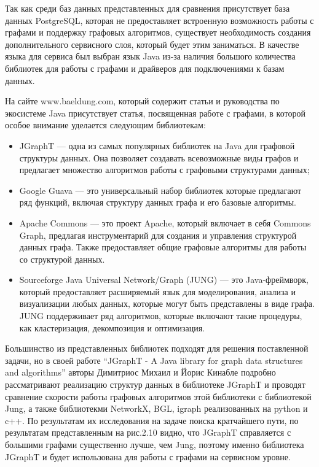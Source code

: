 Так как среди баз данных представленных для сравнения присутствует база данных PostgreSQL, которая не предоставляет встроенную возможность работы с графами и поддержку графовых алгоритмов, существует необходимость создания дополнительного сервисного слоя, который будет этим заниматься. В качестве языка для сервиса был выбран язык Java из-за наличия большого количества библиотек для работы с графами и драйверов для подключениями к базам данных.

На сайте www.baeldung.com, который содержит статьи и руководства по экосистеме Java присутствует статья, посвященная работе с графами, в которой особое внимание уделается следующим библиотекам:

\begin{itemize}
    \item JGraphT — одна из самых популярных библиотек на Java для графовой структуры данных. Она позволяет создавать всевозможные виды графов и предлагает множество алгоритмов работы с графовыми структурами данных;
    \item Google Guava — это универсальный набор библиотек которые предлагают ряд функций, включая структуру данных графа и его базовые алгоритмы.
    \item Apache Commons — это проект Apache, который включает в себя Commons Graph, предлагая инструментарий для создания и управления структурой данных графа. Также предоставляет общие графовые алгоритмы для работы со структурой данных.
    \item Sourceforge Java Universal Network/Graph (JUNG) — это Java-фреймворк, который предоставляет расширяемый язык для моделирования, анализа и визуализации любых данных, которые могут быть представлены в виде графа. JUNG поддерживает ряд алгоритмов, которые включают такие процедуры, как кластеризация, декомпозиция и оптимизация.
\end{itemize}

Большинство из представленных библиотек подходят для решения поставленной задачи, но в своей работе “JGraphT - A Java library for graph data structures and algorithms” авторы Димитриос Михаил и Йорис Кинабле подробно рассматривают реализацию структур данных в библиотеке JGraphT и проводят сравнение скорости работы графовых алгоритмов этой библиотеки с библиотекой Jung, а также библиотекми NetworkX, BGL, igraph реализованных на python и c++. По результатам их исследования на задаче поиска кратчайшего пути, по результатам представленным на рис.2.10 видно, что JGraphT справляется с большими графами существенно лучше, чем Jung, поэтому именно библиотека JGraphT и будет использована для работы с графами на сервисном уровне.

